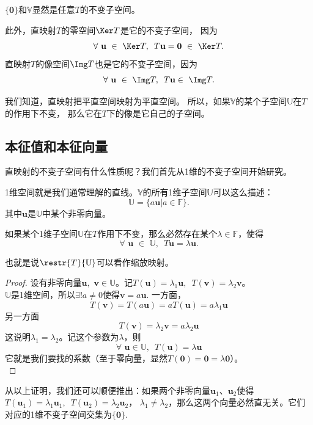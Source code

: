 \documentclass[12pt,UTF8]{ctexbook}
\begin{document}
$\{\mathbf{0}\}$和$\mathbb{V}$显然是任意$T$的不变子空间。

此外，直映射$T$的零空间$\Ker T$是它的不变子空间，
因为
$$\forall \,\, \mathbf{u} \,\, \in \,\, \Ker T, \,\,\, T\mathbf{u} = \mathbf{0} \,\, \in \,\, \Ker T. $$
直映射$T$的像空间$\Img T$也是它的不变子空间，因为
$$\forall \,\, \mathbf{u} \,\, \in \,\, \Img T, \,\,\, T\mathbf{u} \in \,\, \Img T. $$

我们知道，直映射把平直空间映射为平直空间。
所以，如果$\mathbb{V}$的某个子空间$\mathbb{U}$在$T$的作用下不变，
那么它在$T$下的像是它自己的子空间。

\subsection{本征值和本征向量}
直映射的不变子空间有什么性质呢？我们首先从1维的不变子空间开始研究。

1维空间就是我们通常理解的直线。$\mathbb{V}$的所有1维子空间$\mathbb{U}$可以这么描述：
$$\mathbb{U} = \{a\mathbf{u} | a \in \mathbb{F}\}.$$
其中$\mathbf{u}$是$\mathbb{U}$中某个非零向量。

\begin{pp}\label{pp:6_1}
    如果某个1维子空间$\mathbb{U}$在$T$作用下不变，那么必然存在某个$\lambda \in \mathbb{F}$，使得
    $$ \forall \,\, \mathbf{u} \,\, \in \,\,\mathbb{U} ,\,\,\, T\mathbf{u} = \lambda\mathbf{u}.$$
\end{pp}
也就是说$\restr{T}{\mathbb{U}}$可以看作缩放映射。
\begin{proof} %
    设有非零向量$\mathbf{u}, \,\, \mathbf{v} \in \mathbb{U}$。记$T(\mathbf{u}) = \lambda_1 \mathbf{u} , \,\,\, T(\mathbf{v}) = \lambda_2 \mathbf{v}$。\\
    $\mathbb{U}$是1维空间，所以$\exists ! a \neq 0$使得$\mathbf{v} = a\mathbf{u}$. 一方面，
    $$ T(\mathbf{v}) = T(a\mathbf{u}) = a T(\mathbf{u}) = a\lambda_1 \mathbf{u}$$
    另一方面
    $$ T(\mathbf{v}) = \lambda_2 \mathbf{v} = a\lambda_2 \mathbf{u}$$
    这说明$\lambda_1 = \lambda_2$。记这个参数为$\lambda$，则
    $$\forall \,\, \mathbf{u} \in \mathbb{U}, \,\,\,T(\mathbf{u}) = \lambda\mathbf{u}$$
    它就是我们要找的系数（至于零向量，显然$T(\mathbf{0}) = \mathbf{0} = \lambda \mathbf{0}$）。\\
\end{proof}

从以上证明，我们还可以顺便推出：如果两个非零向量$\mathbf{u}_1$、$\mathbf{u}_2$使得$T(\mathbf{u}_1) = \lambda_1\mathbf{u}_1, \,\,\, T(\mathbf{u}_2) = \lambda_2\mathbf{u}_2$，
$\lambda_1 \neq \lambda_2$，那么这两个向量必然直无关。它们对应的1维不变子空间交集为$\{\mathbf{0}\}$.
\end{document}
